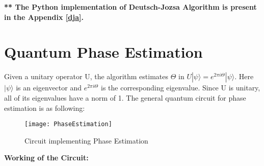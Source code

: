 \documentclass[12pt]{report}
\begin{document}
\textbf{** The Python implementation of Deutsch-Jozsa Algorithm is present in the Appendix \ref{dja}.}

\section{Quantum Phase Estimation}

Given a unitary operator U, the algorithm estimates $\Theta$ in $U|\psi\rangle = e^{2\pi i\Theta}|\psi\rangle$. Here $|\psi\rangle$ is an eigenvector and $e^{2\pi i \Theta}$ is the corresponding eigenvalue. Since U is unitary, all of its eigenvalues have a norm of 1. The general quantum circuit for phase estimation is as following:
\begin{figure}[h]
\centering
\texttt{[image: PhaseEstimation]}
\caption{Circuit implementing Phase Estimation}
\label{fig:PE}
\end{figure} 
\newpage
\textbf{Working of the Circuit:}\\
\end{document}
